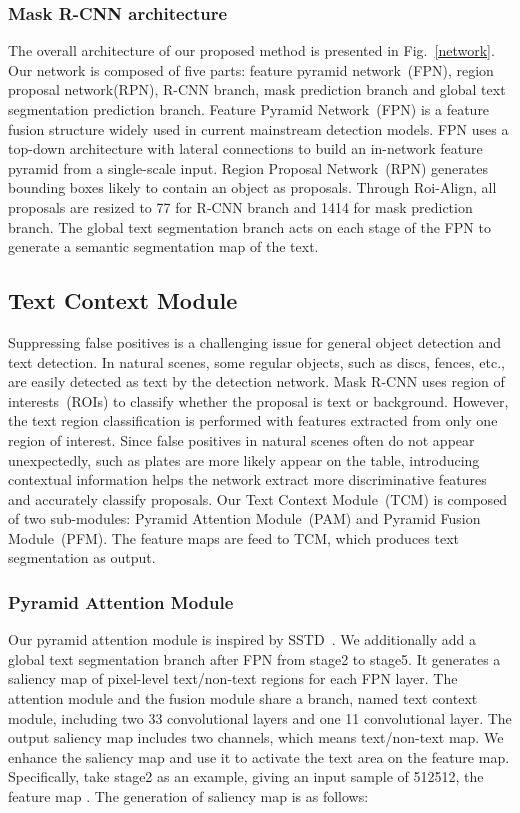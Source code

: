 \documentclass[letterpaper]{article} \usepackage{aaai19}  \usepackage{times}  \usepackage{helvet}  \usepackage{courier}  \usepackage{url}  \usepackage{graphicx}
\begin{document}
 \subsubsection{Mask R-CNN architecture}
The overall architecture of our proposed method is presented in Fig.~\ref{network}. Our network is composed of five parts: feature pyramid network~(FPN), region proposal network(RPN), R-CNN branch, mask prediction branch and global text segmentation prediction branch.
Feature Pyramid Network~(FPN) is a feature fusion structure widely used in current mainstream detection models. 
FPN uses a top-down architecture with lateral connections to build an in-network feature pyramid from a single-scale input.
Region Proposal Network~(RPN) generates bounding boxes likely to contain an object as proposals.
Through Roi-Align, all proposals are resized to 77 for R-CNN branch and 1414 for mask prediction branch.
The global text segmentation branch acts on each stage of the FPN to generate a semantic segmentation map of the text. 





 \subsection{Text Context Module}
Suppressing false positives is a challenging issue for general object detection and text detection. 
In natural scenes, some regular objects, such as discs, fences, etc., are easily detected as text by the detection network.
Mask R-CNN uses region of interests~(ROIs) to classify whether the proposal is text or background.
However, the text region classification is performed with features extracted from only one region of interest.
Since false positives in natural scenes often do not appear unexpectedly, such as plates are more likely appear on the table, introducing contextual information helps the network extract more discriminative features and accurately classify proposals.
Our Text Context Module~(TCM) is composed of two sub-modules:
Pyramid Attention Module~(PAM) and Pyramid Fusion Module~(PFM).
The feature maps are feed to TCM, which produces text segmentation as output.
 



 
 \subsubsection{Pyramid Attention Module}
 Our pyramid attention module is inspired by SSTD~\cite{he2017single}. We additionally add a global text segmentation branch after FPN from stage2 to stage5.
It generates a saliency map of pixel-level text/non-text regions for each FPN layer. 
The attention module and the fusion module share a branch, named text context module, including two 33 convolutional layers and one 11 convolutional layer.
The output saliency map includes two channels, which means text/non-text map. 
We enhance the saliency map and use it to activate the text area on the feature map.
Specifically, take stage2 as an example, giving an input sample of 512512, the feature map . 
The generation of saliency map is as follows:
\end{document}

